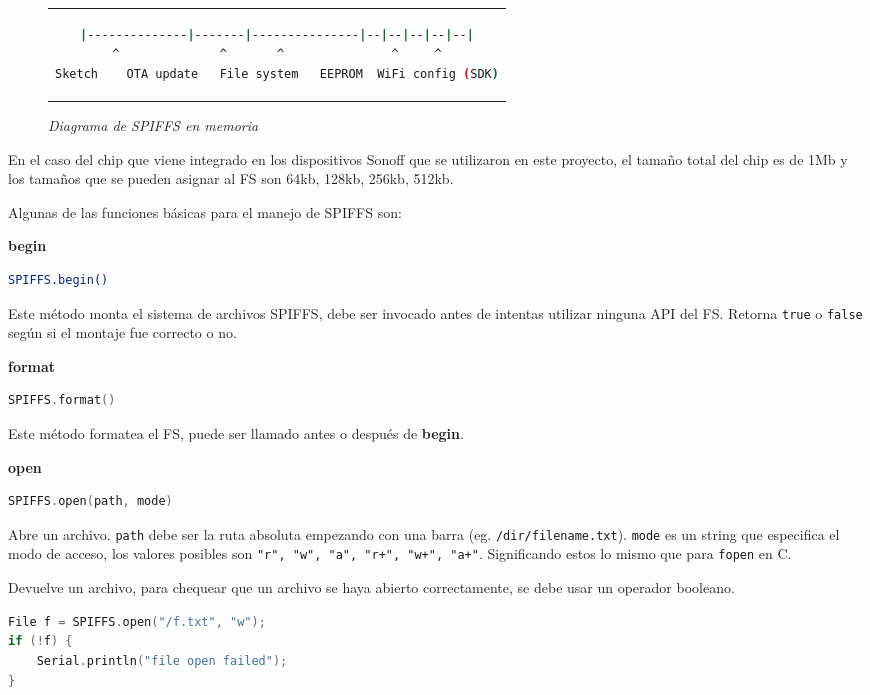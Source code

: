 \begin{figure}[thp]
\centering
\begin{tabular}{c}
\begin{lstlisting}[language=bash]
|--------------|-------|---------------|--|--|--|--|--|
^              ^       ^               ^     ^
Sketch    OTA update   File system   EEPROM  WiFi config (SDK)
\end{lstlisting}
\end{tabular}
\caption{\textit{Diagrama de SPIFFS en memoria}}
\label{lst:SPIFFS}
\end{figure}

En el caso del chip que viene integrado en los dispositivos Sonoff que se utilizaron en este proyecto, el tamaño total del chip es de 1Mb y los tamaños que se pueden asignar al FS son 64kb, 128kb, 256kb, 512kb.

Algunas de las funciones básicas para el manejo de SPIFFS son:

\textbf{begin}
\begin{lstlisting}[language=bash]
SPIFFS.begin()
\end{lstlisting}
Este método monta el sistema de archivos SPIFFS, debe ser invocado antes de intentas utilizar ninguna API del FS. Retorna \lstinline[columns=fixed]{true} o \lstinline[columns=fixed]{false} según si el montaje fue correcto o no.

\textbf{format}
\begin{lstlisting}[language=C]
SPIFFS.format()
\end{lstlisting}
Este método formatea el FS, puede ser llamado antes o después de \textbf{begin}.

\textbf{open}
\begin{lstlisting}[language=C]
SPIFFS.open(path, mode)
\end{lstlisting}
Abre un archivo. \lstinline[columns=fixed]{path} debe ser la ruta absoluta empezando con una barra (eg. \lstinline[columns=fixed]{/dir/filename.txt}). \lstinline[columns=fixed]{mode} es un string que especifica el modo de acceso, los valores posibles son \lstinline[columns=fixed]{"r", "w", "a", "r+", "w+", "a+"}. Significando estos lo mismo que para \lstinline[columns=fixed]{fopen} en C.

Devuelve un archivo, para chequear que un archivo se haya abierto correctamente, se debe usar un operador booleano.
\begin{lstlisting}[language=C]
File f = SPIFFS.open("/f.txt", "w");
if (!f) {
    Serial.println("file open failed");
}
\end{lstlisting}

